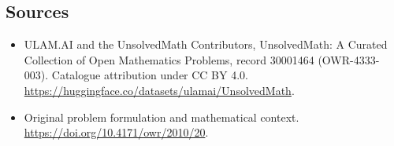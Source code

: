 \documentclass[11pt]{article}
\begin{document}
\subsection{Sources}
\begin{itemize}
\item[\hypertarget{source:30001464:1}{S1}] ULAM.AI and the UnsolvedMath Contributors, UnsolvedMath: A Curated Collection of Open Mathematics Problems, record 30001464 (OWR-4333-003). Catalogue attribution under CC BY 4.0.
\url{https://huggingface.co/datasets/ulamai/UnsolvedMath}.
\item[\hypertarget{source:30001464:2}{S2}] Original problem formulation and mathematical context.
\url{https://doi.org/10.4171/owr/2010/20}.
\end{itemize}
\label{end:30001464}
\end{document}
